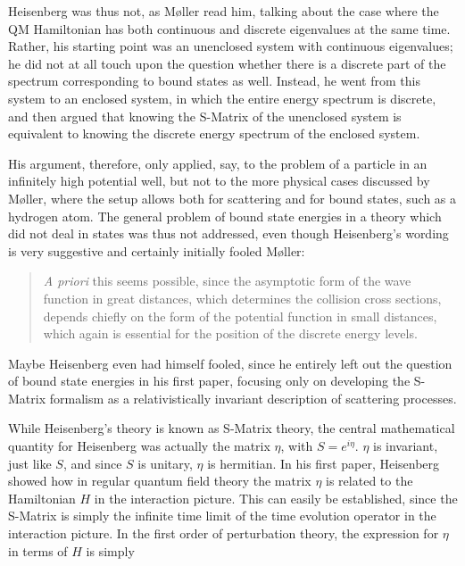 \documentclass[12pt,a4paper]{article}
\begin{document}
Heisenberg was thus not, as M\o ller read him, talking about the case where the QM Hamiltonian has both continuous and discrete eigenvalues at the same time. Rather, his starting point was an unenclosed system with continuous eigenvalues; he did not at all touch upon the question whether there is a discrete part of the spectrum corresponding to bound states as well. Instead, he went from this system to an enclosed system, in which the entire energy spectrum is discrete, and then argued that knowing the S-Matrix of the unenclosed system is equivalent to knowing the discrete energy spectrum of the enclosed system.

His argument, therefore, only applied, say, to the problem of a particle in an infinitely high potential well, but not to the more physical cases discussed by M\o ller, where the setup allows both for scattering and for bound states, such as a hydrogen atom. The general problem of bound state energies in a theory which did not deal in states was thus not addressed, even though Heisenberg's wording is very suggestive and certainly initially fooled M\o ller:

\begin{quote}
\emph{A priori} this seems possible, since the asymptotic form of the wave function in great distances, which determines the collision cross sections, depends chiefly on the form of the potential function in small distances, which again is essential for the position of the discrete energy levels. \citep[p.18]{moller_1945_general}
\end{quote}

Maybe Heisenberg even had himself fooled, since he entirely left out the question of bound state energies in his first paper, focusing only on developing the S-Matrix formalism as a relativistically invariant description of scattering processes.

While Heisenberg's theory is known as S-Matrix theory, the central mathematical quantity for Heisenberg was actually the matrix $\eta$, with $S = e^{i \eta}$. $\eta$ is invariant, just like $S$, and since $S$ is unitary, $\eta$ is hermitian. In his first paper, Heisenberg showed how in regular quantum field theory the matrix $\eta$ is related to the Hamiltonian $H$ in the interaction picture. This can easily be established, since the S-Matrix is simply the infinite time limit of the time evolution operator in the interaction picture. In the first order of perturbation theory, the expression for $\eta$ in terms of $H$ is simply
\end{document}
